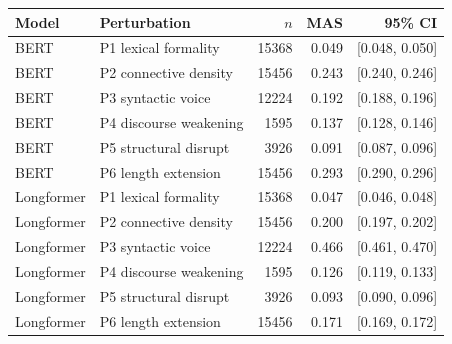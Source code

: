 \begin{tabular}{llrrr}
\toprule
Model & Perturbation & $n$ & MAS & 95\% CI \\
\midrule
BERT & P1 lexical formality & 15368 & 0.049 & [0.048, 0.050] \\
BERT & P2 connective density & 15456 & 0.243 & [0.240, 0.246] \\
BERT & P3 syntactic voice & 12224 & 0.192 & [0.188, 0.196] \\
BERT & P4 discourse weakening & 1595 & 0.137 & [0.128, 0.146] \\
BERT & P5 structural disrupt & 3926 & 0.091 & [0.087, 0.096] \\
BERT & P6 length extension & 15456 & 0.293 & [0.290, 0.296] \\
Longformer & P1 lexical formality & 15368 & 0.047 & [0.046, 0.048] \\
Longformer & P2 connective density & 15456 & 0.200 & [0.197, 0.202] \\
Longformer & P3 syntactic voice & 12224 & 0.466 & [0.461, 0.470] \\
Longformer & P4 discourse weakening & 1595 & 0.126 & [0.119, 0.133] \\
Longformer & P5 structural disrupt & 3926 & 0.093 & [0.090, 0.096] \\
Longformer & P6 length extension & 15456 & 0.171 & [0.169, 0.172] \\
\bottomrule
\end{tabular}